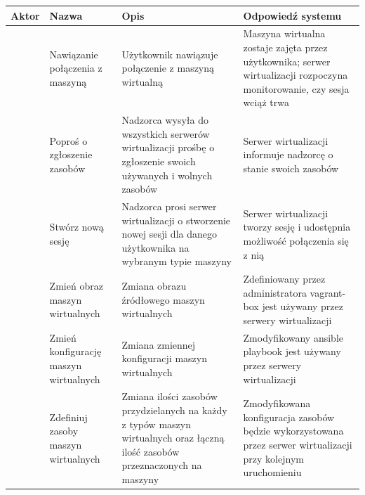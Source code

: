 \documentclass[12pt]{article}
\begin{document}
\begin{center}
	\begin{table}[h!]
		\begin{tabular}{|p{}|p{}|p{}|p{}|}
			\hline Aktor                                    & Nazwa                                 & Opis                                                                                                                         & Odpowiedź systemu                                                                                                                \\ \hline
			\multirow{5}{=}{\rotatebox{90}{Użytkownik}}     & Nawiązanie połączenia z maszyną       & Użytkownik nawiązuje połączenie z maszyną wirtualną                                                                          & Maszyna wirtualna zostaje zajęta przez użytkownika; serwer wirtualizacji rozpoczyna monitorowanie, czy sesja wciąż trwa \newline \\ \hline
			\multirow{8}{=}{\rotatebox{90}{Nadzorca}}       & Poproś o zgłoszenie zasobów           & Nadzorca wysyła do wszystkich serwerów wirtualizacji prośbę o zgłoszenie swoich używanych i wolnych zasobów                  & Serwer wirtualizacji informuje nadzorcę o stanie swoich zasobów                                                                  \\ \cline{2-4}
			                                                & Stwórz nową sesję                     & Nadzorca prosi serwer wirtualizacji o stworzenie nowej sesji dla danego użytkownika na wybranym typie maszyny                & Serwer wirtualizacji tworzy sesję i udostępnia możliwość połączenia się z nią                                                    \\ \hline
			\multirow{11}{=}{\rotatebox{90}{Administrator}} & Zmień obraz maszyn wirtualnych        & Zmiana obrazu źródłowego maszyn wirtualnych                                                                                  & Zdefiniowany przez administratora vagrant-box jest używany przez serwery wirtualizacji                                           \\ \cline{2-4}
			                                                & Zmień konfigurację maszyn wirtualnych & Zmiana zmiennej konfiguracji maszyn wirtualnych                                                                              & Zmodyfikowany ansible playbook jest używany przez serwery wirtualizacji                                                          \\ \cline{2-4}
			                                                & Zdefiniuj zasoby maszyn wirtualnych   & Zmiana ilości zasobów przydzielanych na każdy z typów maszyn wirtualnych oraz łączną ilość zasobów przeznaczonych na maszyny & Zmodyfikowana konfiguracja zasobów będzie wykorzystowana przez serwer wirtualizacji przy kolejnym uruchomieniu                   \\
			\hline
		\end{tabular}
	\end{table}
\end{center}
\end{document}
